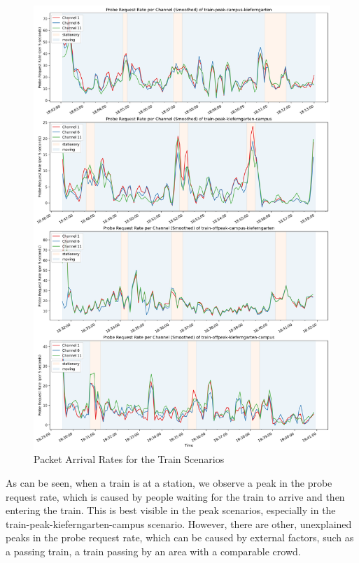 \documentclass[sigconf,nonacm]{acmart}
\begin{document}
\begin{figure}
    \centering
    \includegraphics[width=\columnwidth]{images/part1/probe-rate/train-scenarios.png}
    \caption{Packet Arrival Rates for the Train Scenarios}
    \label{fig:train_packet_arrival_rate}
\end{figure}

As can be seen, when a train is at a station, we observe a peak in the probe request rate, which is caused by people waiting for the train to arrive and then entering the train. This is best visible in the peak scenarios, especially in the train-peak-kieferngarten-campus scenario. However, there are other, unexplained peaks in the probe request rate, which can be caused by external factors, such as a passing train, a train passing by an area with a comparable crowd.
\end{document}
